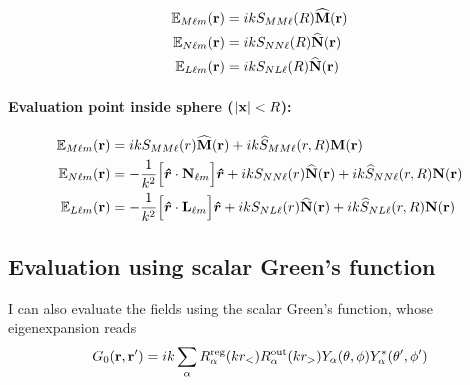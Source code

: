 \documentclass[letterpaper]{article}
\begin{document}
\begin{align*}
 \mathbb{E}_{M\ell m}(\mathbf{r})&=ikS_{MM\ell}(R)\widehat{\mathbf{M}}(\mathbf{r}) \\
 \mathbb{E}_{N\ell m}(\mathbf{r})&=ikS_{NN\ell}(R)\widehat{\mathbf{N}}(\mathbf{r}) \\
 \mathbb{E}_{L\ell m}(\mathbf{r})&=ikS_{NL\ell}(R)\widehat{\mathbf{N}}(\mathbf{r}) \\
\end{align*}

\paragraph{Evaluation point inside sphere ($|\mathbf{x}|<R$):}
\begin{subequations}
\begin{align}
 \mathbb{E}_{M\ell m}(\mathbf{r})&=
    ik S_{MM\ell}(r)\widehat{\mathbf{M}}(\mathbf{r})
  + ik \widehat{S}_{MM\ell}(r,R)\mathbf{M}(\mathbf{r})
\\
 \mathbb{E}_{N\ell m}(\mathbf{r})&=
    -\frac{1}{k^2}\Big[\boldsymbol{\hat{r}}\cdot \mathbf{N}_{\ell m}\Big] \boldsymbol{\hat{r}}
  + ik S_{NN\ell}(r)\widehat{\mathbf{N}}(\mathbf{r})
  + ik \widehat{S}_{NN\ell}(r,R)\mathbf{N}(\mathbf{r})
\\
 \mathbb{E}_{L\ell m}(\mathbf{r})&=
    -\frac{1}{k^2}\Big[\boldsymbol{\hat{r}}\cdot \mathbf{L}_{\ell m}\Big] \boldsymbol{\hat{r}}
  + ik S_{NL\ell}(r)\widehat{\mathbf{N}}(\mathbf{r})
  + ik \widehat{S}_{NL\ell}(r,R)\mathbf{N}(\mathbf{r})
\end{align}
\label{InteriorEFields}
\end{subequations}

\subsection*{Evaluation using scalar Green's function}

I can also evaluate the fields using the scalar Green's function,
whose eigenexpansion reads
$$ G_0(\mathbf{r}, \mathbf{r}^\prime) 
   = ik\sum_{\alpha} R^{\text{\scriptsize reg}}_\alpha(kr_<) R^{\text{\scriptsize out}}_\alpha(kr_>)
     Y_{\alpha}(\theta,\phi) Y^*_\alpha(\theta^\prime, \phi^\prime)
$$
         
\end{document}
